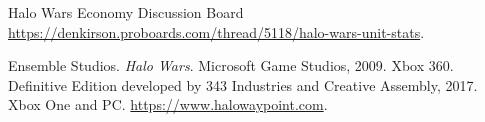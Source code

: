 \documentclass[a4paper, 12pt, english]{article}
\begin{document}
\newpage
\patchcmd{\thebibliography}{\section*}{\section}{}{}
\begin{thebibliography}{99}

    Halo Wars Economy Discussion Board
	\url{https://denkirson.proboards.com/thread/5118/halo-wars-unit-stats}.

    Ensemble Studios. \textit{Halo Wars}. Microsoft Game Studios, 2009. Xbox 360. Definitive Edition developed by 343 Industries and Creative Assembly, 2017. Xbox One and PC. \url{https://www.halowaypoint.com}.


\end{thebibliography}
\noindent
\end{document}
